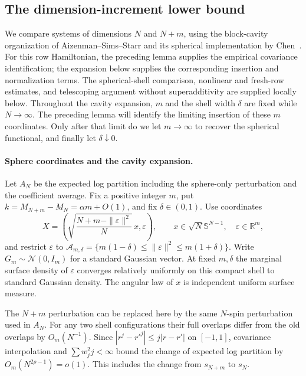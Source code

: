 \documentclass[11pt,a4paper]{article}
\numberwithin{equation}{section}
\theoremstyle{definition}
\theoremstyle{remark}
\newcommand{\R}{\mathbb R}
\newcommand{\cN}{\mathcal N}
\newcommand{\eps}{\varepsilon}
\begin{document}
\subsection{The dimension-increment lower bound}

We compare systems of dimensions $N$ and $N+m$, using the block-cavity
organization of Aizenman--Sims--Starr
\cite[Theorem~1(ii), equations~(27)--(33)]{AizenmanSimsStarr2003} and
its spherical implementation by Chen~\cite[Theorem~2.1]{Chen2013SphericalASS}.
For this row Hamiltonian, the preceding lemma supplies the empirical
covariance identification; the expansion below supplies the corresponding
insertion and normalization terms. The spherical-shell comparison, nonlinear
and fresh-row estimates, and telescoping argument without superadditivity
are supplied locally below. Throughout the cavity expansion, $m$ and the shell width $\delta$ are fixed while $N\to\infty$.
The preceding lemma will identify the limiting insertion of these $m$
coordinates. Only after that limit do we let $m\to\infty$ to recover the
spherical functional, and finally let $\delta\downarrow0$.

\paragraph{Sphere coordinates and the cavity expansion.}
Let $A_N$ be the expected log partition including the sphere-only perturbation
and the coefficient average. Fix a positive integer $m$, put
$k=M_{N+m}-M_N=\alpha m+O(1)$, and fix $\delta\in(0,1)$.
Use coordinates
\[
 X=\left(\sqrt{\frac{N+m-\|\eps\|^2}{N}}\,x,\eps\right),
 \qquad x\in\sqrt N\mathbb S^{N-1},\quad\eps\in\R^m,
\]
and restrict $\eps$ to
$\mathcal A_{m,\delta}=\{m(1-\delta)\le\|\eps\|^2\le m(1+\delta)\}$.
Write $G_m\sim\cN(0,I_m)$ for a standard Gaussian vector.
At fixed $m,\delta$ the marginal surface density of $\eps$ converges relatively
uniformly on this compact shell to standard Gaussian density. The angular
law of $x$ is independent uniform surface measure.

The $N+m$ perturbation can be replaced here by the same $N$-spin perturbation
used in $A_N$. For any two shell configurations their full overlaps differ
from the old overlaps by $O_m(N^{-1})$. Since
$|r^j-r'^j|\le j|r-r'|$ on $[-1,1]$, covariance interpolation and
$\sum w_j^2j<\infty$ bound the change of expected log partition by
$O_m(N^{2\rho-1})=o(1)$. This includes the change from $s_{N+m}$ to $s_N$.
\end{document}
